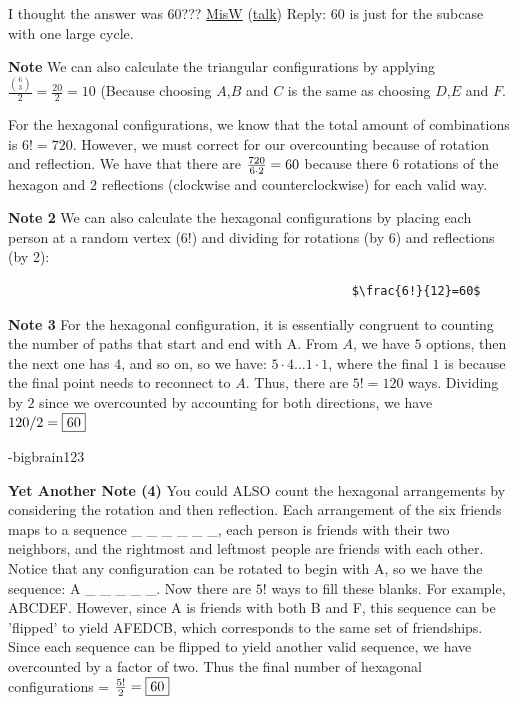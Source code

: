 \begin{enumerate}
 
I thought the answer was 60??? \href{https://artofproblemsolving.com/wiki/index.php?title=User:Maxisw}{MisW} (\href{https://artofproblemsolving.com/wiki/index.php?title=User\_talk:Maxisw}{talk}) Reply: 60 is just for the subcase with one large cycle.

 \textbf{Note} We can also calculate the triangular configurations by applying $\frac{\binom{6}{3}}{2} = \frac{20}{2}=10$ (Because choosing $A$,$B$ and $C$ is the same as choosing $D$,$E$ and $F$.

 
For the hexagonal configurations, we know that the total amount of combinations is $6!=720$. However, we must correct for our  overcounting because of rotation and reflection. We have that there are ${720 \over 6 \cdot 2} = 60$ because there $6$ rotations of the hexagon and 2 reflections (clockwise and counterclockwise) for each valid way.

 \textbf{Note 2} We can also calculate the hexagonal configurations by placing each person at a random vertex (6!) and dividing for rotations (by 6) and reflections (by 2): 

 \begin{verbatim}
												$\frac{6!}{12}=60$
\end{verbatim}

\textbf{Note 3} For the hexagonal configuration, it is essentially congruent to counting the number of paths that start and end with A. From $A$, we have $5$ options, then the next one has $4$, and so on, so we have: $5\cdot 4 \hdots 1 \cdot 1$, where the final $1$ is because the final point needs to reconnect to $A$. Thus, there are $5! = 120$ ways. Dividing by $2$ since we overcounted by accounting for both directions, we have $120/2 = \fbox{60}$

 -bigbrain123

 \textbf{Yet Another Note (4)} You could ALSO count the hexagonal arrangements by considering the rotation and then reflection. Each arrangement of the six friends maps to a sequence \_ \_ \_ \_ \_ \_, each person is friends with their two neighbors, and the rightmost and leftmost people are friends with each other. Notice that any configuration can be rotated to begin with A, so we have the sequence: A \_ \_ \_ \_ \_. Now there are $5!$ ways to fill these blanks. For example, ABCDEF. However, since A is friends with both B and F, this sequence can be 'flipped' to yield AFEDCB, which corresponds to the same set of friendships. Since each sequence can be flipped to yield another valid sequence, we have overcounted by a factor of two. Thus the final number of hexagonal configurations = $\frac{5!}{2} = \fbox{60}$


\end{enumerate}

